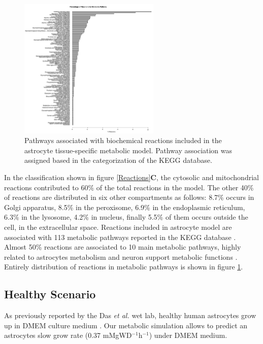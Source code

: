 \begin{figure}[h]
\begin{center}
\includegraphics[width=0.6\textwidth]{neuroprotective/Pathways}
\end{center}
\caption{Pathways associated with biochemical reactions included in the astrocyte tissue-specific metabolic model. Pathway association was assigned based in the categorization of the KEGG database.}
\label{Pathways}
\end{figure}
In the classification shown in figure \ref{Reactions}\textbf{C}, the cytosolic and mitochondrial reactions contributed to 60\% of the total reactions in the model. The other 40\% of reactions are distributed in six other compartments as follows: 8.7\% occurs in Golgi apparatus, 8.5\% in the peroxisome, 6.9\% in the endoplasmic reticulum, 6.3\% in the lysosome, 4.2\% in nucleus, finally 5.5\% of them occurs outside the cell, in the extracellular space.
Reactions included in astrocyte model are associated with 113 metabolic pathways reported in the KEGG database \cite{Kanehisa2000}. Almost 50\% reactions are associated to 10 main metabolic pathways, highly related to astrocytes metabolism and neuron support metabolic functions \cite{Fitch1997,Ciccarelli2001,Cakir2007,Giaume2010, Sertbas2014, Sa2016}. Entirely distribution of reactions in metabolic pathways is shown in figure \ref{Pathways}. 
\subsection*{Healthy Scenario}
As previously reported by the Das \emph{et al.} wet lab, healthy human astrocytes grow up in DMEM culture medium \cite{Das2010}. Our metabolic simulation allows to predict an astrocytes slow grow rate  (0.37 mMgWD$^{-1}$h$^{-1}$) under DMEM medium.

